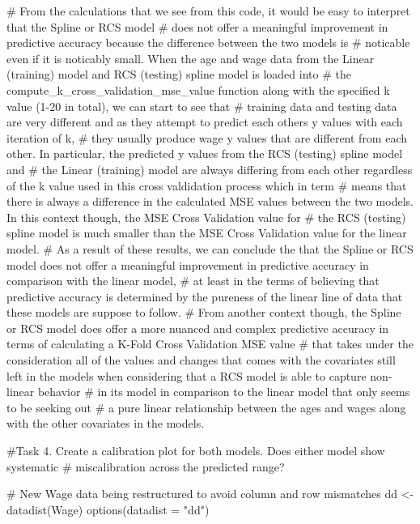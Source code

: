 \documentclass[
  letterpaper,
  DIV=11,
  numbers=noendperiod]{scrreprt}
\newenvironment{Shaded}{\begin{snugshade}}{\end{snugshade}}
\newcommand{\AttributeTok}[1]{\textcolor[rgb]{0.40,0.45,0.13}{#1}}
\newcommand{\CommentTok}[1]{\textcolor[rgb]{0.37,0.37,0.37}{#1}}
\newcommand{\FunctionTok}[1]{\textcolor[rgb]{0.28,0.35,0.67}{#1}}
\newcommand{\NormalTok}[1]{\textcolor[rgb]{0.00,0.23,0.31}{#1}}
\newcommand{\OtherTok}[1]{\textcolor[rgb]{0.00,0.23,0.31}{#1}}
\newcommand{\StringTok}[1]{\textcolor[rgb]{0.13,0.47,0.30}{#1}}
\begin{document}
{\begin{Shaded}
\begin{Highlighting}[]
\CommentTok{\# From the calculations that we see from this code, it would be easy to interpret that the Spline or RCS model}
\CommentTok{\# does not offer a meaningful improvement in predictive accuracy because the difference between the two models is }
\CommentTok{\# noticable even if it is noticably small. When the age and wage data from the Linear (training) model and RCS (testing) spline model is loaded into}
\CommentTok{\# the compute\_k\_cross\_validation\_mse\_value function along with the specified k value (1{-}20 in total), we can start to see that}
\CommentTok{\# training data and testing data are very different and as they attempt to predict each other\textquotesingle{}s y values with each iteration of k,}
\CommentTok{\# they usually produce wage y values that are different from each other. In particular, the predicted y values from the RCS (testing) spline model and}
\CommentTok{\# the Linear (training) model are always differing from each other regardless of the k value used in this cross valdidation process which in term }
\CommentTok{\# means that there is always a difference in the calculated MSE values between the two models. In this context though, the MSE Cross Validation value for}
\CommentTok{\# the RCS (testing) spline model is much smaller than the MSE Cross Validation value for the linear model.}
\CommentTok{\# As a result of these results, we can conclude the that the Spline or RCS model does not offer a meaningful improvement in predictive accuracy in comparison with the linear model,}
\CommentTok{\# at least in the terms of believing that predictive accuracy is determined by the pureness of the linear line of data that these models are suppose to follow.}
\CommentTok{\# From another context though, the Spline or RCS model does offer a more nuanced and complex predictive accuracy in terms of calculating a K{-}Fold Cross Validation MSE value}
\CommentTok{\# that takes under the consideration all of the values and changes that comes with the covariates still left in the models when considering that a RCS model is able to capture non{-}linear behavior}
\CommentTok{\# in its model in comparison to the linear model that only seems to be seeking out}
\CommentTok{\# a pure linear relationship between the ages and wages along with the other covariates in the models.}


\CommentTok{\#Task 4. Create a calibration plot for both models. Does either model show systematic }
\CommentTok{\# miscalibration across the predicted range?}

\CommentTok{\# New Wage data being restructured to avoid column and row mismatches}
\NormalTok{dd }\OtherTok{\textless{}{-}} \FunctionTok{datadist}\NormalTok{(Wage)}
\FunctionTok{options}\NormalTok{(}\AttributeTok{datadist =} \StringTok{"dd"}\NormalTok{)}


\end{Highlighting}
\end{Shaded}}
\end{document}
